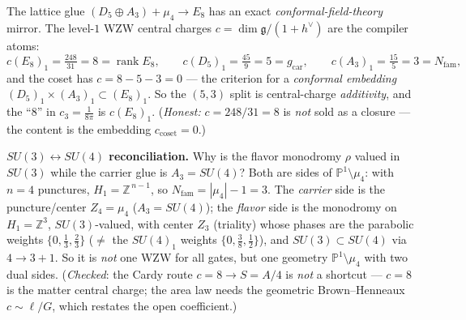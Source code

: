 \documentclass[11pt,a4paper]{article}
\newcommand{\cthree}{c_3}
\newcommand{\gcar}{g_{\mathrm{car}}}
\newcommand{\Nfam}{N_{\mathrm{fam}}}
\newcommand{\Z}{\mathbb Z}
\begin{document}
\begin{winbox}[The boundary-CFT mirror: central charges $=$ compiler atoms \mE\ (\veri{v61\_cft\_bridge.py})]
The lattice glue $(D_5{\oplus}A_3){+}\mu_4\to E_8$ has an exact \emph{conformal-field-theory} mirror. The
level-$1$ WZW central charges $c=\dim\mathfrak g/(1{+}h^\vee)$ are the compiler atoms:
\[
  c(E_8)_1=\tfrac{248}{31}=8=\operatorname{rank}E_8,\qquad c(D_5)_1=\tfrac{45}{9}=5=\gcar,\qquad c(A_3)_1=\tfrac{15}{5}=3=\Nfam,
\]
and the coset has $c=8-5-3=0$ --- the criterion for a \emph{conformal embedding}
$(D_5)_1{\times}(A_3)_1\subset(E_8)_1$. So the $(5,3)$ split is central-charge \emph{additivity}, and the
``$8$'' in $\cthree=\tfrac1{8\pi}$ is $c(E_8)_1$. (\emph{Honest:} $c=248/31{=}8$ is \emph{not} sold as a
closure --- the content is the embedding $c_{\mathrm{coset}}{=}0$.)

\textbf{$SU(3)\leftrightarrow SU(4)$ reconciliation.} Why is the flavor monodromy $\rho$ valued in $SU(3)$
while the carrier glue is $A_3{=}SU(4)$? Both are sides of $\mathbb P^1\setminus\mu_4$: with $n{=}4$ punctures,
$H_1=\Z^{\,n-1}$, so $\Nfam=|\mu_4|-1=3$. The \emph{carrier} side is the puncture/center $Z_4{=}\mu_4$
($A_3{=}SU(4)$); the \emph{flavor} side is the monodromy on $H_1{=}\Z^3$, $SU(3)$-valued, with center
$Z_3$ (triality) whose phases are the parabolic weights $\{0,\tfrac13,\tfrac23\}$ ($\neq$ the $SU(4)_1$
weights $\{0,\tfrac38,\tfrac12\}$), and $SU(3)\subset SU(4)$ via $4\to3{+}1$. So it is \emph{not} one WZW for
all gates, but one geometry $\mathbb P^1\setminus\mu_4$ with two dual sides. (\emph{Checked}: the Cardy route
$c{=}8\to S{=}A/4$ is \emph{not} a shortcut --- $c{=}8$ is the matter central charge; the area law needs the
geometric Brown--Henneaux $c\sim\ell/G$, which restates the open coefficient.)
\end{winbox}
\end{document}
